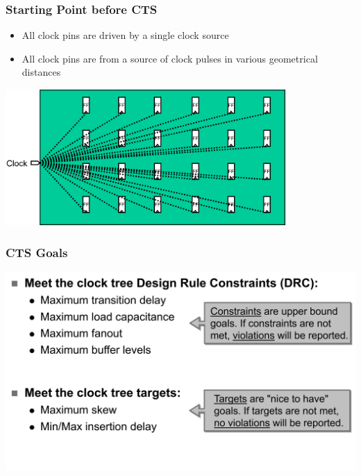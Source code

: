 \documentclass[compress]{beamer}
\begin{document}
\begin{frame}
	\frametitle{Starting Point before CTS}
		\begin{itemize}
			\item All clock pins are driven by a single clock source
			\item All clock pins are from a source of clock pulses in various geometrical distances		
		\end{itemize}
	\begin{center}
	\includegraphics[width=0.8\textwidth]{CTS1}
\end{center}
		
\end{frame}
\begin{frame}
	\frametitle{CTS Goals}
	\begin{center}
		\includegraphics[width=\textwidth]{GOALS}
	\end{center}
\end{frame}
\end{document}
